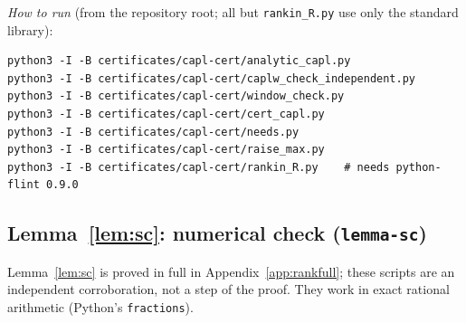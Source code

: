 \emph{How to run} (from the repository root; all but \texttt{rankin\_R.py} use only the standard library):
\begingroup\footnotesize
\begin{verbatim}
python3 -I -B certificates/capl-cert/analytic_capl.py
python3 -I -B certificates/capl-cert/caplw_check_independent.py
python3 -I -B certificates/capl-cert/window_check.py
python3 -I -B certificates/capl-cert/cert_capl.py
python3 -I -B certificates/capl-cert/needs.py
python3 -I -B certificates/capl-cert/raise_max.py
python3 -I -B certificates/capl-cert/rankin_R.py    # needs python-flint 0.9.0
\end{verbatim}
\endgroup


\subsection{\texorpdfstring{Lemma~\ref{lem:sc}}{Lemma SC}: numerical check (\texttt{lemma-sc})}\label{app:cert-sc}
Lemma~\ref{lem:sc} is proved in full in Appendix~\ref{app:rankfull}; these scripts are an independent corroboration, not a step of
the proof. They work in exact rational arithmetic (Python's \texttt{fractions}).
